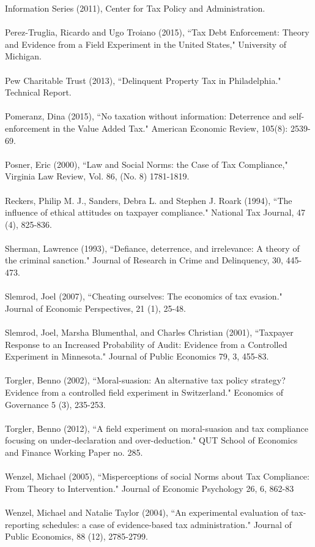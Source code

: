 \documentclass[12pt,titlepage]{article}
\begin{document}
Information Series (2011), Center for Tax Policy and Administration.
\\ 
\\ 
Perez-Truglia, Ricardo and Ugo Troiano (2015), ``Tax Debt Enforcement:
Theory and Evidence from a Field Experiment in the United States,"
University of Michigan.  \\ 
\\ 
Pew Charitable Trust (2013), ``Delinquent Property Tax in
Philadelphia." Technical Report. \\ 
\\ 
Pomeranz, Dina (2015), ``No taxation without information: Deterrence
and self-enforcement in the Value Added Tax."  American Economic Review, 
105(8): 2539-69. \\ 
\\ 
Posner, Eric (2000), ``Law and Social Norms: the Case of Tax
Compliance," Virginia Law Review, Vol. 86, (No. 8)
1781-1819. \\ 
\\ 
Reckers, Philip M. J., Sanders, Debra L. and Stephen J. Roark (1994),
``The influence of ethical attitudes on taxpayer compliance." National
Tax Journal, 47 (4), 825-836. \\ 
\\ 
Sherman, Lawrence (1993), ``Defiance, deterrence, and irrelevance: A
theory of the criminal sanction."  Journal of Research in Crime and
Delinquency, 30, 445-473. \\ 
\\ 
Slemrod, Joel (2007), ``Cheating ourselves: The economics of tax
evasion." Journal of Economic Perspectives, 21 (1),
25-48. \\ 
\\ 
Slemrod, Joel, Marsha Blumenthal, and Charles Christian (2001),
``Taxpayer Response to an Increased Probability of Audit: Evidence
from a Controlled Experiment in Minnesota." Journal of Public
Economics 79, 3, 455-83.\\ 
\\ 
Torgler, Benno (2002), ``Moral-suasion: An alternative tax policy
strategy?  Evidence from a controlled field experiment in
Switzerland." Economics of Governance 5 (3), 235-253. \\ 
\\ 
Torgler, Benno (2012), ``A field experiment on moral-suasion and tax
compliance focusing on under-declaration and over-deduction." QUT
School of Economics and Finance Working Paper no. 285. \\ 
\\ 
Wenzel, Michael (2005), ``Misperceptions of social Norms about Tax
Compliance: From Theory to Intervention." Journal of Economic
Psychology 26, 6, 862-83\\ 
\\ 
Wenzel, Michael and Natalie Taylor (2004), ``An experimental
evaluation of tax-reporting schedules: a case of evidence-based tax
administration." Journal of Public Economics, 88 (12), 2785-2799.
\end{document}
